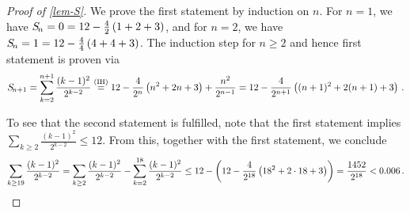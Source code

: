 \spacingbetweenappproofs

\begin{proof}[Proof of \cref{lem-S}] \label{proof-lem-S}
We prove the first statement by induction on $n$.
For $n = 1$, we have $S\!_n = 0 = 12 - \frac{4}{2}\left({1+2+3}\right)$, 
and for $n = 2$, we have
$S\!_n = 1 = 12 - \frac{4}{4} \left({4+4+3}\right)$.
The induction step for $n \geq 2$ and hence first statement is proven via
{
\newcommand{\aw}{4}
\[
S\!_{n+1} = \sum_{k = 2}^{n+1} \frac{(k-1)^2}{2^{k-2}}
        \overset{\text{(IH)}}{=}  12 - \frac{4}{2^n} \left({n^2 + 2 n+ 3}\right) + \frac{n^2}{2^{n-1}}
        = 12 - \frac{4}{2^{n+1}} \left({(n+1)^2 + 2 (n+1) + 3}\right)\,.
\]
}

To see that the second statement is fulfilled,
note that the first statement implies
$\sum_{k \geq 2} \frac{(k-1)^2}{2^{k-2}} \leq 12$.
From this, together with the first statement, we conclude
\[
  \sum_{k \geq 19} \frac{(k-1)^2}{2^{k-2}}
  = \sum_{k \geq2} \frac{(k-1)^2}{2^{k-2}} - \sum_{k = 2}^{18} \frac{(k-1)^2}{2^{k-2}}
  \leq
    12 - \left({12 - \frac{4}{2^{18}} \left({18^2 + 2 \cdot 18 + 3}\right)}\right)
  = \frac{1452}{2^{18}}
  < 0.006\,. \qedhere
\]
\end{proof}

\spacingbetweenappproofs

